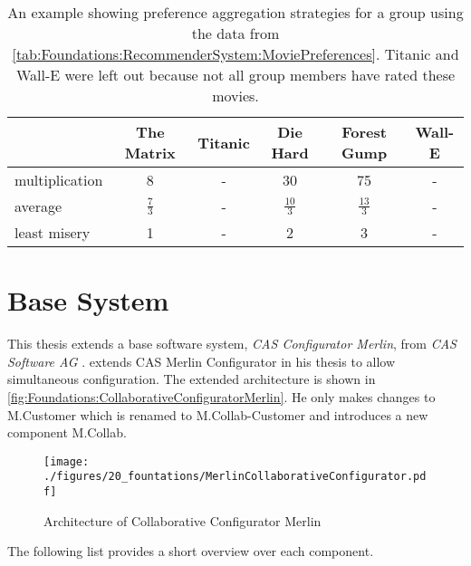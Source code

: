 \begin{table}
    \centering    
    \begin{tabular}{ l | c | c | c | c | c }
        & The Matrix & Titanic & Die Hard & Forest Gump & Wall-E \\ \hline
         multiplication  & 8 & - & 30 & 75 & - \\
         average  & $\frac{7}{3}$ & - & $\frac{10}{3}$ & $\frac{13}{3}$ & - \\
         least misery  & 1 & - & 2 & 3 & - \\
    \end{tabular}
    \caption[Movies: Result Matrix for Group Aggregation Strategies]{An example showing preference aggregation strategies for a group using the data from \autoref{tab:Foundations:RecommenderSystem:MoviePreferences}. Titanic and Wall-E were left out because not all group members have rated these movies.}
    
    \label{tab:Foundations:RecommenderSystem:AggregationStrategy}
\end{table}

\section{Base System}
\label{sec:Foundations:BaseSystem}

This thesis extends a base software system, \emph{CAS Configurator Merlin}, from \emph{CAS Software AG} \cite{CASSoftwareAG}. \citeauthor{raabKollaborativeProduktkonfigurationEchtzeit2019} \cite{raabKollaborativeProduktkonfigurationEchtzeit2019} extends CAS Merlin Configurator in his thesis to allow simultaneous configuration. The extended architecture is shown in \autoref{fig:Foundations:CollaborativeConfiguratorMerlin}.
He only makes changes to M.Customer which is renamed to M.Collab-Customer and introduces a new component M.Collab.

\begin{figure}
    \centering
    \texttt{[image: ./figures/20\_fountations/MerlinCollaborativeConfigurator.pdf]}
    \caption[Architecture: Collaborative Configurator]{Architecture of Collaborative Configurator Merlin \cite[Fig. 4.3]{raabKollaborativeProduktkonfigurationEchtzeit2019}}
    \label{fig:Foundations:CollaborativeConfiguratorMerlin}
\end{figure}

The following list provides a short overview over each component.


